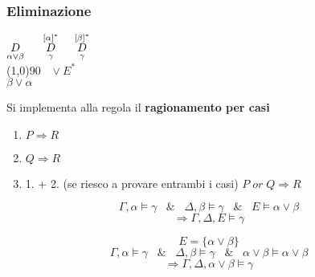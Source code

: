 \documentclass{article}
\theoremstyle{break}
\theoremstyle{break}
\theoremstyle{break}
\theoremstyle{break}
\begin{document}
\subsubsection{Eliminazione}
\begin{center}
  \( \underset{\alpha \vee \beta}{D} \hspace{0.5cm} \stackrel{[\alpha]^*}{\underset{\gamma}{D}} \hspace{0.5cm} \stackrel{[\beta]^*}{\underset{\gamma}{D}} \)\\
  \hspace{0.9cm}\line(1,0){90}\(\;\;\; \vee E^* \)\\  
  \( \beta \vee \alpha \)
\end{center}
Si implementa alla regola il \textbf{ragionamento per casi}
\begin{enumerate}
  \item \( P \Rightarrow R \) 
  \item \( Q \Rightarrow R \) 
  \item 1. + 2. (se riesco a provare entrambi i casi) \( P\;or\;Q \Rightarrow R \) 
\end{enumerate}
\begin{example}
  \[
    \Gamma,\alpha \models \gamma\;\;\; \&\;\;\; \Delta,\beta \models \gamma\;\;\; \&\;\;\; E \models \alpha \vee \beta
  \]
  \[
    \Rightarrow \Gamma,\Delta,E \models \gamma
  \] 
\end{example}
\begin{example}
  \[
    E = \{\alpha \vee \beta\} 
  \] 
  \[
    \Gamma,\alpha \models \gamma\;\;\; \&\;\;\; \Delta,\beta \models \gamma\;\;\; \& \;\;\; \alpha \vee \beta \models \alpha \vee \beta
  \] 
  \[
    \Rightarrow \Gamma,\Delta,\alpha \vee \beta \models \gamma
  \] 
\end{example}
\end{document}
